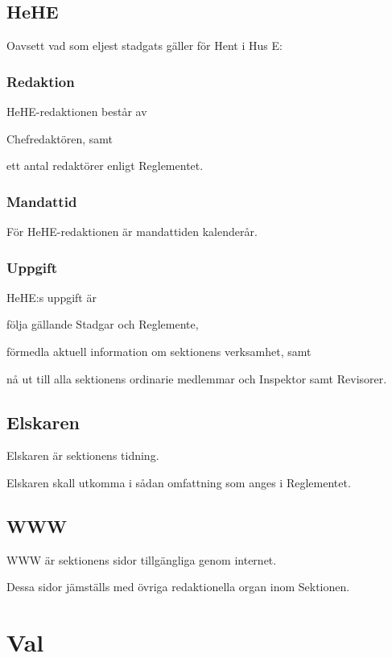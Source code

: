 \documentclass[10pt]{article}
\begin{document}
\subsection{HeHE}
Oavsett vad som eljest stadgats gäller för Hent i Hus E:

\subsubsection{Redaktion}
HeHE-redaktionen består av
\begin{alphlist}
\item Chefredaktören, samt
\item ett antal redaktörer enligt Reglementet.
\end{alphlist}

\subsubsection{Mandattid}
För HeHE-redaktionen är mandattiden kalenderår.

\subsubsection{Uppgift}
HeHE:s uppgift är

\begin{attlist}
\item följa gällande Stadgar och Reglemente,
\item förmedla aktuell information om sektionens verksamhet, samt
\item nå ut till alla sektionens ordinarie medlemmar och Inspektor samt
    Revisorer.
\end{attlist}

\subsection{Elskaren}
Elskaren är sektionens tidning.

Elskaren skall utkomma i sådan omfattning som anges i Reglementet.

\subsection{WWW}
WWW är sektionens sidor tillgängliga genom internet.

Dessa sidor jämställs med övriga redaktionella organ inom Sektionen.
\newpage

\section{Val}
\end{document}
